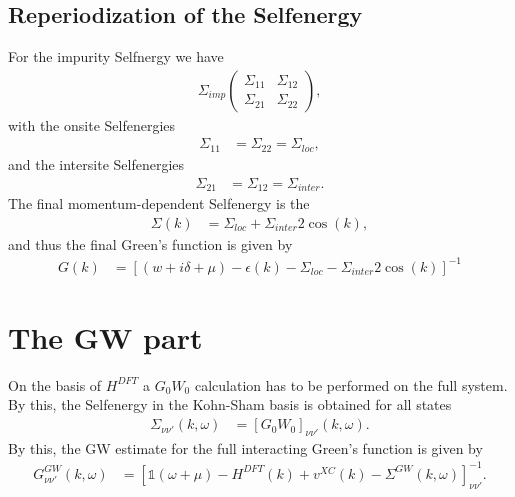 \documentclass[12pt,a4paper]{scrartcl}
\numberwithin{equation}{section}
\newcommand{\GF}{Green's function}
\newcommand{\unity}{\mathds{1}}
\begin{document}
\subsection{Reperiodization of the Selfenergy}
For the impurity Selfnergy we have
\begin{align}
\Sigma_{imp}
 \begin{pmatrix}
  \Sigma_{11} & \Sigma_{12} \\
  \Sigma_{21} & \Sigma_{22}
 \end{pmatrix},
\end{align}
with the onsite Selfenergies
\begin{align}
 \Sigma_{11} &= \Sigma_{22} = \Sigma_{loc},
\end{align}
and the intersite Selfenergies
\begin{align}
 \Sigma_{21} &= \Sigma_{12} = \Sigma_{inter}.
\end{align}
The final momentum-dependent Selfenergy is the 
\begin{align}
 \Sigma(k) &= \Sigma_{loc} + \Sigma_{inter} 2 \cos( k),
\end{align}
and thus the final Green's function is given by
\begin{align}
 G(k) &= \left[ (w+i\delta+\mu ) - \epsilon(k) - \Sigma_{loc} - \Sigma_{inter} 2 \cos( k) \right]^{-1}
\end{align}



\section{The GW part}

On the basis of $H^{DFT}$ a $G_0W_0$ calculation has to be performed on the full
system. By this, the Selfenergy in the Kohn-Sham basis is obtained for all states
\begin{align}
 \Sigma_{\nu\nu'}(k,\omega)
 &= \left[ G_0W_0  \right]_{\nu\nu'}(k,\omega).
\end{align}
By this, the GW estimate for the full interacting {\GF} is given by
\begin{align}
 G^{GW}_{\nu\nu'}(k,\omega) 
 &= \left[ \unity(\omega +\mu ) -H^{DFT}(k)+v^{XC}(k) - \Sigma^{GW}(k,\omega)  \right]^{-1}_{\nu\nu'}.
\end{align}
\end{document}
